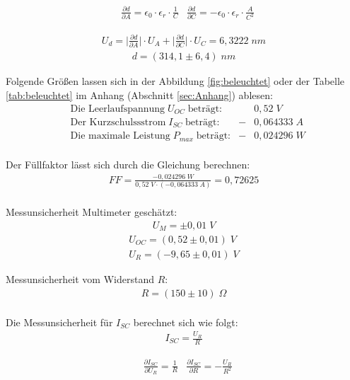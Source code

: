 \documentclass[a4paper]{scrartcl}
\numberwithin{equation}{subsection}
\begin{document}
\begin{align}
&\frac{\partial d}{\partial A} = \epsilon_0 \cdot \epsilon_r \cdot \frac{1}{C}
&\frac{\partial d}{\partial C} = - \epsilon_0 \cdot \epsilon_r \cdot \frac{A}{C^2}
\end{align}

\begin{align*}
U_d = \bigg | \frac{\partial d}{\partial A} \bigg | \cdot U_A + \bigg | \frac{\partial d}{\partial C} 
\bigg | \cdot U_C = 6,3222 \; nm
\end{align*}
\begin{align*}
d = (314,1 \pm 6,4)\; nm
\end{align*}

Folgende Größen lassen sich in der Abbildung \ref{fig:beleuchtet} oder der Tabelle \ref{tab:beleuchtet} im 
Anhang (Abschnitt \ref{sec:Anhang}) ablesen:
\begin{align*}
&\text{Die Leerlaufspannung}\; U_{OC} \; \text{beträgt:} &&0,52\;V \\
&\text{Der Kurzschulssstrom}\; I_{SC} \; \text{beträgt:} &-&0,064333\;A \\
&\text{Die maximale Leistung}\; P_{max} \; \text{beträgt:} &-&0,024296\;W\\
\end{align*}

Der Füllfaktor lässt sich durch die Gleichung berechnen:
\begin{align*}
FF = \frac{-0,024296\;W}{0,52\;V \cdot (-0,064333\;A)} = 0,72625
\end{align*}
\\
Messunsicherheit Multimeter geschätzt:
\begin{align*}
U_M = \pm 0,01\;V
\end{align*}
\begin{align*}
U_{OC} = (0,52 \pm 0,01)\;V \\
U_R = (-9,65 \pm 0,01)\;V
\end{align*}

Messunsicherheit vom Widerstand $R$:
\begin{align*}
R = (150 \pm 10)\; \Omega \\
\end{align*}

Die Messunsicherheit für $I_{SC}$ berechnet sich wie folgt:
\begin{align*}
I_{SC} = \frac{U_R}{R}
\end{align*}

\begin{align}
&\frac{\partial I_{SC}}{\partial U_R} = \frac{1}{R}
&\frac{\partial I_{SC}}{\partial R} = - \frac{U_R}{R^2}
\end{align}
\end{document}
